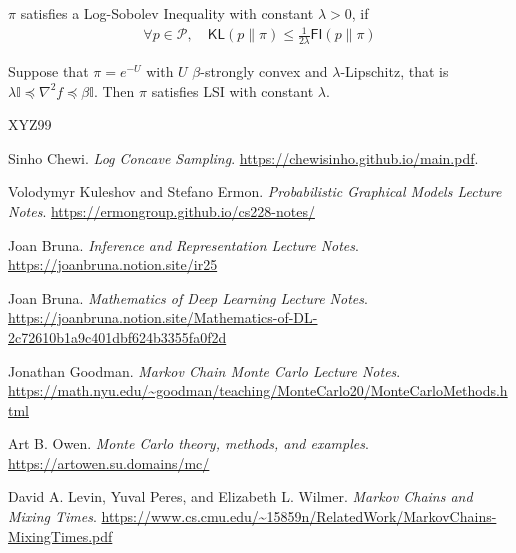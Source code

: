 \begin{definition}
	 $\pi$ satisfies a Log-Sobolev Inequality with constant $\lambda >0$, if
	\begin{align}
		\forall p \in \mathcal P, \quad \textsf{KL}(p \| \pi) \leq \frac{1}{2\lambda} \textsf{FI}(p \| \pi)
	\end{align}
\end{definition}


\begin{fact}
	 Suppose that $\pi = e^{-U}$ with $U$ $\beta$-strongly convex and $\lambda$-Lipschitz, that is $\lambda \mathbb I \preceq \nabla^2 f \preceq \beta \mathbb I$. Then $\pi$ satisfies LSI with constant $\lambda$.
\end{fact}




\begin{thebibliography}{XYZ99}  %

Sinho Chewi. \emph{Log Concave Sampling}. \url{https://chewisinho.github.io/main.pdf}.

Volodymyr Kuleshov and Stefano Ermon. \emph{Probabilistic Graphical Models Lecture Notes}. \url{https://ermongroup.github.io/cs228-notes/}

Joan Bruna. \emph{Inference and Representation Lecture Notes}. \url{https://joanbruna.notion.site/ir25}

Joan Bruna. \emph{Mathematics of Deep Learning Lecture Notes}. \url{https://joanbruna.notion.site/Mathematics-of-DL-2c72610b1a9c401dbf624b3355fa0f2d}


Jonathan Goodman. \emph{Markov Chain Monte Carlo Lecture Notes}. \url{https://math.nyu.edu/~goodman/teaching/MonteCarlo20/MonteCarloMethods.html}

Art B. Owen. \emph{Monte Carlo theory, methods, and examples}. \url{https://artowen.su.domains/mc/}

David A. Levin, Yuval Peres, and Elizabeth L. Wilmer. \emph{Markov Chains and Mixing Times}. \url{https://www.cs.cmu.edu/~15859n/RelatedWork/MarkovChains-MixingTimes.pdf}

\end{thebibliography}







